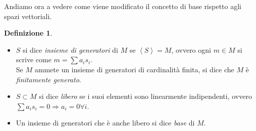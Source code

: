 \documentclass[a4paper,10pt]{article}
\theoremstyle{plain}
\theoremstyle{definition}
\newtheorem{defn}{Definizione}[section]
\newcommand{\gen}[1]{\ensuremath{\left< #1\right>}}
\begin{document}
Andiamo ora a vedere come viene modificato il concetto di base rispetto agli spazi vettoriali.
\begin{defn}$ $
    \begin{itemize}
        \item $S$ si dice \emph{insieme di generatori} di $M$ se $\gen{S}=M$, ovvero ogni $m\in M$ si scrive come $m=\sum a_is_i$.\\
        Se $M$ ammete un insieme di generatori di cardinalità finita, si dice che $M$ è \emph{finitamente generato}.
        \item $S\subset M$ si dice \emph{libero} se i suoi elementi sono linearmente indipendenti, ovvero $\sum a_is_i=0\Rightarrow a_i=0\forall i$.
        \item Un insieme di generatori che è anche libero si dice \emph{base} di $M$.
    \end{itemize}
\end{defn}
\end{document}
